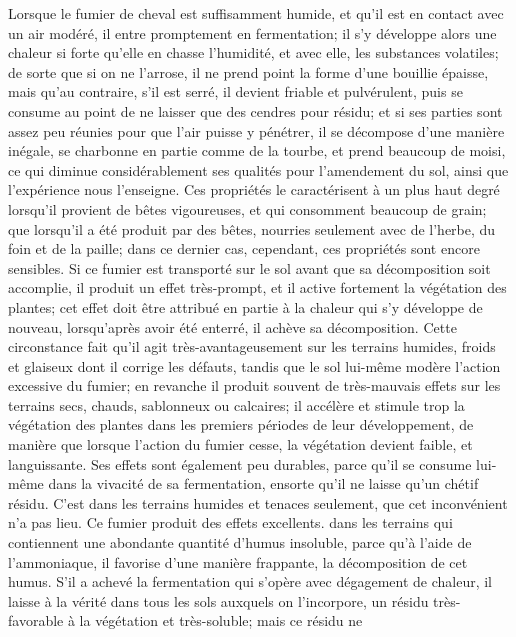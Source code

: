 Lorsque le fumier de cheval est suffisamment humide, et qu’il est en contact avec un air modéré, il entre promptement en fermentation; il s’y développe alors une chaleur si forte qu’elle en chasse l’humidité, et avec elle, les substances volatiles; de sorte que si on ne l’arrose, il ne prend point la forme d’une bouillie épaisse, mais qu’au contraire, s’il est serré, il devient friable et pulvérulent, puis se consume au point de ne laisser que des cendres pour résidu; et si ses parties sont assez peu réunies pour que l’air puisse y pénétrer, il se décompose d’une manière inégale, se charbonne en partie comme de la tourbe, et prend beaucoup de moisi, ce qui diminue considérablement ses qualités pour l’amendement du sol, ainsi que l’expérience nous l’enseigne. Ces propriétés le caractérisent à un plus haut degré lorsqu’il provient de bêtes vigoureuses, et qui consomment beaucoup de grain; que\setcounter{page}{235} lorsqu'il a été produit par des bêtes, nourries seulement avec de l'herbe, du foin et de la paille; dans ce dernier cas, cependant, ces propriétés sont encore sensibles. Si ce fumier est transporté sur le sol avant que sa décomposition soit accomplie, il produit un effet très-prompt, et il active fortement la végétation des plantes; cet effet doit être attribué en partie à la chaleur qui s'y développe de nouveau, lorsqu'après avoir été enterré, il achève sa décomposition. Cette circonstance fait qu'il agit très-avantageusement sur les terrains humides, froids et glaiseux dont il corrige les défauts, tandis que le sol lui-même modère l'action excessive du fumier; en revanche il produit souvent de très-mauvais effets sur les terrains secs, chauds, sablonneux ou calcaires; il accélère et stimule trop la végétation des plantes dans les premiers périodes de leur développement, de manière que lorsque l'action du fumier cesse, la végétation devient faible, et languissante. Ses effets sont également peu durables, parce qu'il se consume lui-même dans la vivacité de sa fermentation, ensorte qu'il ne laisse qu'un chétif résidu. C'est dans les terrains humides et tenaces seulement, que cet inconvénient n'a pas lieu. Ce fumier produit des effets excellents.\setcounter{page}{236} dans les terrains qui contiennent une abondante quantité d'humus insoluble, parce qu'à
l'aide de l'ammoniaque, il favorise d'une
manière frappante, la décomposition de cet
humus. S'il a achevé la fermentation qui s'opère avec dégagement de chaleur, il laisse
à la vérité dans tous les sols auxquels on
l'incorpore, un résidu très-favorable à la végétation et très-soluble; mais ce résidu ne
